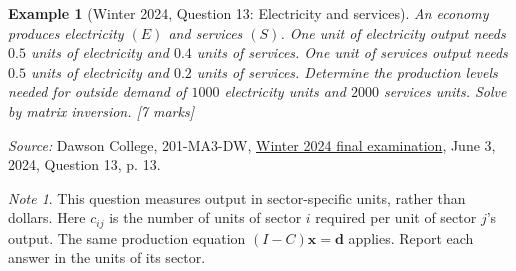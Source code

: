 \documentclass{article}
\theoremstyle{plain}
\newtheorem{example}{Example}[section]
\theoremstyle{definition}
\theoremstyle{remark}
\newtheorem*{note}{Note}
\renewcommand{\vec}[1]{\mathbf{#1}}
\newcommand{\work}{\par\vfill}
\begin{document}
\work
\newpage
\begin{example}[Winter 2024, Question 13: Electricity and services]\label{ex:dawsonwinter}
An economy produces electricity $(E)$ and services $(S)$. One unit of electricity output needs $0.5$ units of electricity and $0.4$ units of services. One unit of services output needs $0.5$ units of electricity and $0.2$ units of services. Determine the production levels needed for outside demand of $1000$ electricity units and $2000$ services units. Solve by matrix inversion. \hfill [7 marks]
\end{example}
{\small\textit{Source:} Dawson College, 201-MA3-DW, \href{https://www.dawsoncollege.qc.ca/mathematics/wp-content/uploads/sites/113/Winter-2024-3.pdf}{Winter 2024 final examination}, June 3, 2024, Question 13, p. 13.}

\begin{note}
This question measures output in sector-specific units, rather than dollars. Here $c_{ij}$ is the number of units of sector $i$ required per unit of sector $j$'s output. The same production equation $(I-C)\vec{x}=\vec{d}$ applies. Report each answer in the units of its sector.
\end{note}

\work
\end{document}
